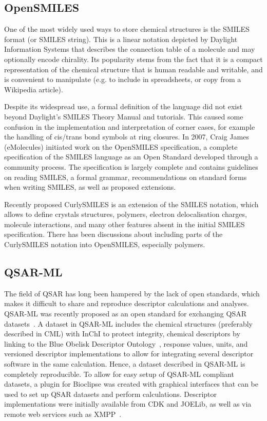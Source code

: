 \documentclass[10pt]{bmc_article}
\newenvironment{bmcformat}{\fussy\setboolean{publ}{true}}{\fussy}
\begin{document}
\begin{bmcformat}
    \subsection*{OpenSMILES}

One of the most widely used ways to store chemical structures is the
SMILES format (or SMILES string). This is a linear notation depicted
by Daylight Information Systems that describes the connection table
of a molecule and may optionally encode chirality. Its popularity
stems from the fact that it is a compact representation of the
chemical structure that is human readable and writable, and is
convenient to manipulate (e.g. to include in spreadsheets, or copy
from a Wikipedia article).

Despite its widespread use, a formal
definition of the language did not exist beyond Daylight's SMILES
Theory Manual and tutorials. This caused some confusion in the
implementation and interpretation of corner cases, for example the
handling of cis/trans bond symbols at ring closures. In 2007, Craig
James (eMolecules) initiated work on the OpenSMILES specification, a
complete specification of the SMILES language as an Open Standard
developed through a community process. The specification is largely
complete and contains guidelines on reading SMILES, a formal
grammar, recommendations on standard forms when writing SMILES, as
well as proposed extensions.

Recently proposed CurlySMILES\cite{CurlySMILES} is an extension of the
SMILES notation, which allows to define crystals structures, polymers,
electron delocalisation charges, molecule interactions, and many other
features absent in the initial SMILES specification. There has been
discussions about including parts of the CurlySMILES notation into
OpenSMILES, especially polymers.


\subsection*{QSAR-ML}
The field of QSAR has long been hampered by the lack of open standards, which makes it difficult to share and reproduce descriptor calculations and analyses. QSAR-ML was recently proposed as an open standard for exchanging QSAR datasets~\cite{Spjuth:2010uq}. A dataset in QSAR-ML includes the chemical structures (preferably described in CML) with InChI to protect integrity, chemical descriptors by linking to the Blue Obelisk Descriptor Ontology~\cite{bodo}, response values, units, and versioned descriptor implementations to allow for integrating several descriptor software in the same calculation. Hence, a dataset described in QSAR-ML is completely reproducible. To allow for easy setup of QSAR-ML compliant datasets, a plugin for Bioclipse was created with graphical interfaces that can be used to set up QSAR datasets and perform calculations. Descriptor implementations were initially available from CDK and JOELib, as well as via remote web services such as XMPP~\cite{Wagener:2009uq}.


\end{bmcformat}
\end{document}
